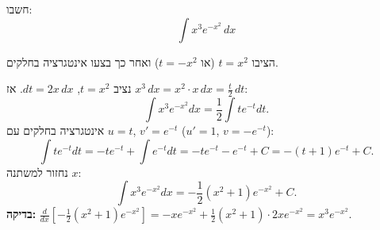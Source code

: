 
\begin{question}
חשבו:
\[ \int x^3e^{-x^2}\,dx \]
\end{question}

\begin{hint}
הציבו $t=x^2$ (או $t=-x^2$) ואחר כך בצעו אינטגרציה בחלקים.
\end{hint}

\begin{solution}
נציב $t=x^2$, $dt=2x\,dx$. אז $x^3\,dx=x^2\cdot x\,dx=\frac t2\,dt$:
\[ \int x^3e^{-x^2}dx=\frac12\int te^{-t}dt. \]
אינטגרציה בחלקים עם $u=t$, $v'=e^{-t}$ ($u'=1$, $v=-e^{-t}$):
\[ \int te^{-t}dt=-te^{-t}+\int e^{-t}dt=-te^{-t}-e^{-t}+C=-(t+1)e^{-t}+C. \]
נחזור למשתנה $x$:
\[ \boxed{\int x^3e^{-x^2}dx=-\frac12(x^2+1)e^{-x^2}+C.} \]
\textbf{בדיקה:} $\frac{d}{dx}\left[-\frac12(x^2+1)e^{-x^2}\right]=-xe^{-x^2}+\frac12(x^2+1)\cdot2xe^{-x^2}=x^3e^{-x^2}$.
\end{solution}
